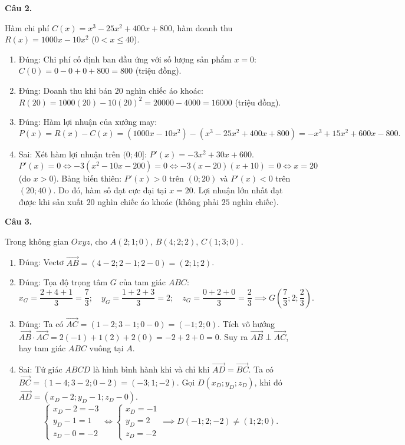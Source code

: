\documentclass[12pt,a4paper]{article}
\newcommand{\loigiai}[1]{\par\medskip\Needspace{4\baselineskip}\noindent\textbf{#1}\par\nobreak}
\begin{document}
\loigiai{Câu 2.}
Hàm chi phí $C(x)=x^3-25x^2+400x+800$, hàm doanh thu $R(x)=1000x-10x^2$ ($0<x\le 40$).
\begin{enumerate}
\item Đúng: Chi phí cố định ban đầu ứng với số lượng sản phẩm $x=0$:
$C(0) = 0 - 0 + 0 + 800 = 800$ (triệu đồng).
\item Đúng: Doanh thu khi bán $20$ nghìn chiếc áo khoác:
$R(20) = 1000(20) - 10(20)^2 = 20000 - 4000 = 16000$ (triệu đồng).
\item Đúng: Hàm lợi nhuận của xưởng may:
$$P(x)=R(x)-C(x)=(1000x-10x^2)-(x^3-25x^2+400x+800)=-x^3+15x^2+600x-800.$$
\item Sai: Xét hàm lợi nhuận trên $(0;40]$:
$P'(x)=-3x^2+30x+600$.
$P'(x)=0 \iff -3(x^2-10x-200)=0 \iff -3(x-20)(x+10)=0 \iff x=20$ (do $x>0$).
Bảng biến thiên: $P'(x)>0$ trên $(0;20)$ và $P'(x)<0$ trên $(20;40)$.
Do đó, hàm số đạt cực đại tại $x=20$. Lợi nhuận lớn nhất đạt được khi sản xuất $20$ nghìn chiếc áo khoác (không phải $25$ nghìn chiếc).
\end{enumerate}

\loigiai{Câu 3.}
Trong không gian $Oxyz$, cho $A(2;1;0)$, $B(4;2;2)$, $C(1;3;0)$.
\begin{enumerate}
\item Đúng: Vectơ $\vec{AB}=(4-2;2-1;2-0)=(2;1;2)$.
\item Đúng: Tọa độ trọng tâm $G$ của tam giác $ABC$:
$$x_G=\dfrac{2+4+1}{3}=\dfrac{7}{3};\quad y_G=\dfrac{1+2+3}{3}=2;\quad z_G=\dfrac{0+2+0}{3}=\dfrac{2}{3} \implies G\left(\dfrac{7}{3};2;\dfrac{2}{3}\right).$$
\item Đúng: Ta có $\vec{AC}=(1-2;3-1;0-0)=(-1;2;0)$.
Tích vô hướng $\vec{AB}\cdot\vec{AC} = 2(-1) + 1(2) + 2(0) = -2 + 2 + 0 = 0$.
Suy ra $\vec{AB}\perp\vec{AC}$, hay tam giác $ABC$ vuông tại $A$.
\item Sai: Tứ giác $ABCD$ là hình bình hành khi và chỉ khi $\vec{AD}=\vec{BC}$.
Ta có $\vec{BC}=(1-4;3-2;0-2)=(-3;1;-2)$.
Gọi $D(x_D;y_D;z_D)$, khi đó $\vec{AD}=(x_D-2;y_D-1;z_D-0)$.
$$\begin{cases} x_D-2=-3\\ y_D-1=1\\ z_D-0=-2 \end{cases} \iff \begin{cases} x_D=-1\\ y_D=2\\ z_D=-2 \end{cases} \implies D(-1;2;-2) \ne (1;2;0).$$
\end{enumerate}
\end{document}
